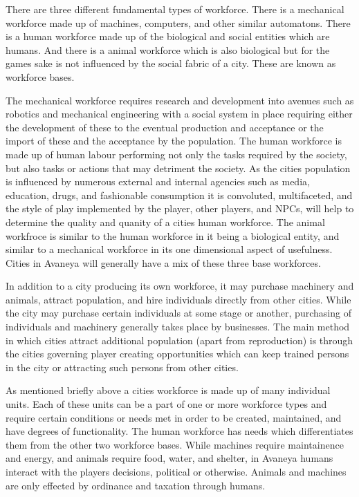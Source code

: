 There are three different fundamental types of workforce. There is a mechanical workforce made up of machines, computers, and other similar automatons. There is a human workforce made up of the biological and social entities which are humans. And there is a animal workforce which is also biological but for the games sake is not influenced by the social fabric of a city. These are known as workforce bases. 

The mechanical workforce requires research and development into avenues such as robotics and mechanical engineering with a social system in place requiring either the development of these to the eventual production and acceptance or the import of these and the acceptance by the population. The human workforce is made up of human labour performing not only the tasks required by the society, but also tasks or actions that may detriment the society. As the cities population is influenced by numerous external and internal agencies such as media, education, drugs, and fashionable consumption it is convoluted, multifaceted, and the style of play implemented by the player, other players, and NPCs, will help to determine the quality and quanity of a cities human workforce. The animal workfroce is similar to the human workforce in it being a biological entity, and similar to a mechanical workforce in its one dimensional aspect of usefulness. Cities in Avaneya will generally have a mix of these three base workforces. 

In addition to a city producing its own workforce, it may purchase machinery and animals, attract population, and hire individuals directly from other cities. While the city may purchase certain individuals at some stage or another, purchasing of individuals and machinery generally takes place by businesses. The main method in which cities attract additional population (apart from reproduction) is through the cities governing player creating opportunities which can keep trained persons in the city or attracting such persons from other cities. 


As mentioned briefly above a cities workforce is made up of many individual units. Each of these units can be a part of one or more workforce types and require certain conditions or needs met in order to be created, maintained, and have degrees of functionality. The human workforce has needs which differentiates them from the other two workforce bases. While machines require maintainence and energy, and animals require food, water, and shelter, in Avaneya humans interact with the players decisions, political or otherwise. Animals and machines are only effected by ordinance and taxation through humans. 

